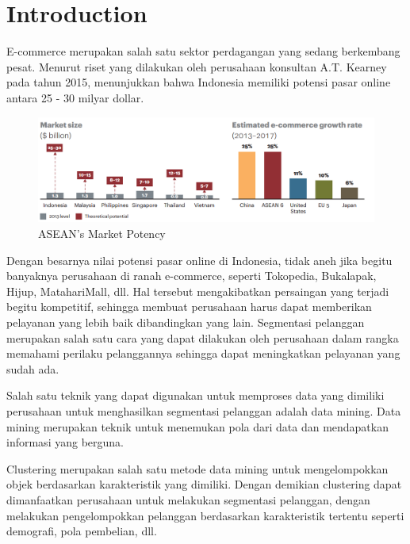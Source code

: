 \documentclass[conference]{IEEEtran}
\begin{document}
%
\IEEEpeerreviewmaketitle



\section{Introduction}
E-commerce merupakan salah satu sektor perdagangan yang sedang berkembang pesat.
Menurut riset yang dilakukan oleh perusahaan konsultan A.T. Kearney pada tahun 2015, menunjukkan bahwa Indonesia memiliki potensi pasar online antara 25 - 30 milyar dollar.

\begin{figure}[h]
\centering
\includegraphics[width=\columnwidth]{figure/marketpotency}
\caption{ASEAN's Market Potency}
\label{market_potency}
\end{figure}

Dengan besarnya nilai potensi pasar online di Indonesia, tidak aneh jika begitu banyaknya perusahaan di ranah e-commerce, seperti Tokopedia, Bukalapak, Hijup, MatahariMall, dll.
Hal tersebut mengakibatkan persaingan yang terjadi begitu kompetitif, sehingga membuat perusahaan harus dapat memberikan pelayanan yang lebih baik dibandingkan yang lain. Segmentasi pelanggan merupakan salah satu cara yang dapat dilakukan oleh perusahaan dalam rangka memahami perilaku pelanggannya sehingga dapat meningkatkan pelayanan yang sudah ada.

Salah satu teknik yang dapat digunakan untuk memproses data yang dimiliki perusahaan untuk menghasilkan segmentasi pelanggan adalah data mining. Data mining merupakan teknik untuk menemukan pola dari data dan mendapatkan informasi yang berguna.

Clustering merupakan salah satu metode data mining untuk mengelompokkan objek berdasarkan karakteristik yang dimiliki. Dengan demikian clustering dapat dimanfaatkan perusahaan untuk melakukan segmentasi pelanggan, dengan melakukan pengelompokkan pelanggan berdasarkan karakteristik tertentu seperti demografi, pola pembelian, dll.
\end{document}
